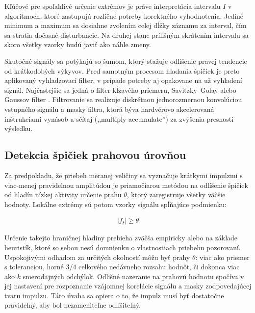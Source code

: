 Kľúčové pre spoľahlivé určenie extrémov je práve interpretácia intervalu $I$ v algoritmoch, ktoré zastupujú rozličné
potreby korektného vyhodnotenia. Jediné minimum a maximum sa dosiahne zvolením celej dĺžky záznamu za interval, čím sa
stratia dočasné disturbancie. Na druhej stane prílišným skrátením intervalu sa skoro všetky vzorky budú javiť ako náhle zmeny.

Skutočné signály sa potýkajú so šumom, ktorý sťažuje odlíšenie pravej tendencie od krátkodobých výkyvov.
Pred samotným procesom hľadania špičiek je preto aplikovaný vyhladzovací filter, v prípade potreby aj opakovane na už
vyhladení signál. Najčastejšie sa jedná o filter
kĺzavého priemeru, Savitzky–Golay alebo Gaussov filter \cite{spectrometry-peak-detection}. Filtrovanie sa realizuje
diskrétnou jednorozmernou konvolúciou vstupného signálu a masky filtra, ktorá býva hardvérovo akcelerovaná inštrukciami vynásob a sčítaj
(,,multiply-accumulate'') za zvýšenia presnosti výsledku.

\subsection{Detekcia špičiek prahovou úrovňou}
Za predpokladu, že priebeh meranej veličiny sa vyznačuje krátkymi impulzmi s viac-menej pravidelnou amplitúdou
je priamočiarou metódou na odlíšenie špičiek od hladín nízkej aktivity určenie prahu $\theta$, ktorý zaregistruje
všetky väčšie hodnoty. Lokálne extrémy sú potom vzorky signálu spĺňajúce podmienku:
\begin{ceqn}\begin{align}
|f_t| \geq \theta
\end{align}\end{ceqn}

Určenie takejto hraničnej hladiny prebieha zväčša empiricky alebo na základe heuristík, ktoré so sebou nesú
domnienku o vlastnostiach priebehu pozorovaní. Uspokojivými odhadom za určitých okolností môžu byť prahy $\theta$:
viac ako priemer s toleranciou, horné $3/4$ celkového nedávneho rozsahu hodnôt, či dokonca viac ako $k$
smerodajných odchýlok. Odlišné nazeranie na prahovú hodnotu spočíva v jej nastavení pre rozpoznanie
vzájomnej korelácie signálu a masky zodpovedajúcej tvaru impulzu. Táto úvaha sa opiera o to, že impulz
musí byť dostatočne pravidelný, aby bol nezameniteľne odlíšiteľný.

